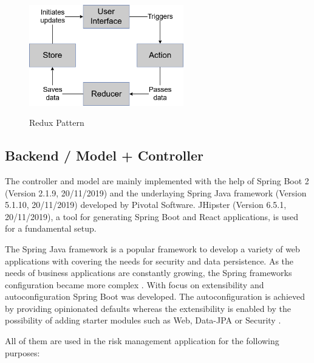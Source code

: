 \begin{figure}[h]
	\centering
	\includegraphics[width=0.6\textwidth]{Content/Domain/ReduxPattern.png}
	\caption{Redux Pattern}
	\cite{own representation}
	\label{fig:reduxpattern}
\end{figure}

\subsection{Backend / Model + Controller}
\label{sec:DomainCc}
The controller and model are mainly implemented with the help of Spring Boot 2 (Version 2.1.9, 20/11/2019) and the underlaying Spring Java framework (Version 5.1.10,  20/11/2019) developed by Pivotal Software. JHipster (Version 6.5.1, 20/11/2019), a tool for generating Spring Boot and React applications, is used for a fundamental setup.

The Spring Java framework is a popular framework to develop a variety of web applications with covering the needs for security and data persistence. As the needs of business applications are constantly growing, the Spring frameworks configuration became more complex \cite[p. 1]{prasadreddyBeginningSpringBoot2017}. With focus on extensibility and autoconfiguration Spring Boot was developed. The autoconfiguration is achieved by providing opinionated defaults whereas the extensibility is enabled by the possibility of adding starter modules such as Web, Data-\ac{JPA}  or Security \cite[p. 21-22]{prasadreddyBeginningSpringBoot2017}. 

All of them are used in the risk management application for the following purposes:

